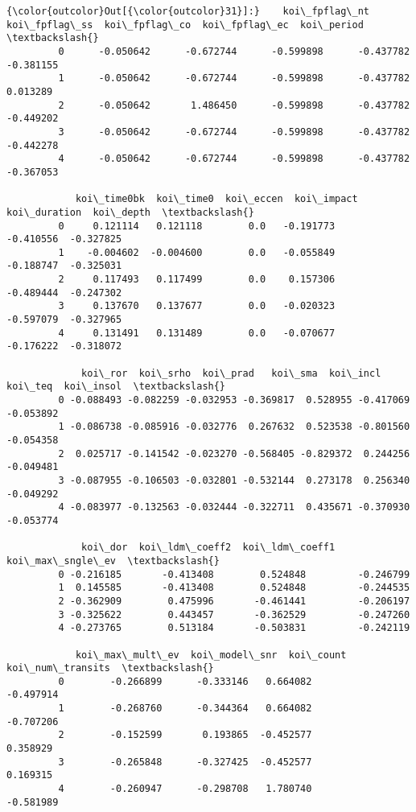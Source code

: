 \documentclass[11pt]{article}
\begin{document}
\begin{Verbatim}[commandchars=\\\{\}]
{\color{outcolor}Out[{\color{outcolor}31}]:}    koi\_fpflag\_nt  koi\_fpflag\_ss  koi\_fpflag\_co  koi\_fpflag\_ec  koi\_period  \textbackslash{}
         0      -0.050642      -0.672744      -0.599898      -0.437782   -0.381155   
         1      -0.050642      -0.672744      -0.599898      -0.437782    0.013289   
         2      -0.050642       1.486450      -0.599898      -0.437782   -0.449202   
         3      -0.050642      -0.672744      -0.599898      -0.437782   -0.442278   
         4      -0.050642      -0.672744      -0.599898      -0.437782   -0.367053   
         
            koi\_time0bk  koi\_time0  koi\_eccen  koi\_impact  koi\_duration  koi\_depth  \textbackslash{}
         0     0.121114   0.121118        0.0   -0.191773     -0.410556  -0.327825   
         1    -0.004602  -0.004600        0.0   -0.055849     -0.188747  -0.325031   
         2     0.117493   0.117499        0.0    0.157306     -0.489444  -0.247302   
         3     0.137670   0.137677        0.0   -0.020323     -0.597079  -0.327965   
         4     0.131491   0.131489        0.0   -0.070677     -0.176222  -0.318072   
         
             koi\_ror  koi\_srho  koi\_prad   koi\_sma  koi\_incl   koi\_teq  koi\_insol  \textbackslash{}
         0 -0.088493 -0.082259 -0.032953 -0.369817  0.528955 -0.417069  -0.053892   
         1 -0.086738 -0.085916 -0.032776  0.267632  0.523538 -0.801560  -0.054358   
         2  0.025717 -0.141542 -0.023270 -0.568405 -0.829372  0.244256  -0.049481   
         3 -0.087955 -0.106503 -0.032801 -0.532144  0.273178  0.256340  -0.049292   
         4 -0.083977 -0.132563 -0.032444 -0.322711  0.435671 -0.370930  -0.053774   
         
             koi\_dor  koi\_ldm\_coeff2  koi\_ldm\_coeff1  koi\_max\_sngle\_ev  \textbackslash{}
         0 -0.216185       -0.413408        0.524848         -0.246799   
         1  0.145585       -0.413408        0.524848         -0.244535   
         2 -0.362909        0.475996       -0.461441         -0.206197   
         3 -0.325622        0.443457       -0.362529         -0.247260   
         4 -0.273765        0.513184       -0.503831         -0.242119   
         
            koi\_max\_mult\_ev  koi\_model\_snr  koi\_count  koi\_num\_transits  \textbackslash{}
         0        -0.266899      -0.333146   0.664082         -0.497914   
         1        -0.268760      -0.344364   0.664082         -0.707206   
         2        -0.152599       0.193865  -0.452577          0.358929   
         3        -0.265848      -0.327425  -0.452577          0.169315   
         4        -0.260947      -0.298708   1.780740         -0.581989   
         

\end{Verbatim}
\end{document}
